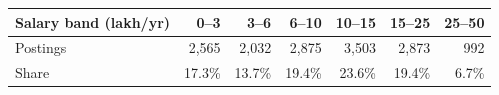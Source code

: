 \begin{tabular}{@{}l r r r r r r@{}}
\toprule
Salary band (lakh/yr) & 0--3 & 3--6 & 6--10 & 10--15 & 15--25 & 25--50 \\
\midrule
Postings & 2,565 & 2,032 & 2,875 & 3,503 & 2,873 & 992 \\
Share & 17.3\% & 13.7\% & 19.4\% & 23.6\% & 19.4\% & 6.7\% \\
\bottomrule
\end{tabular}
